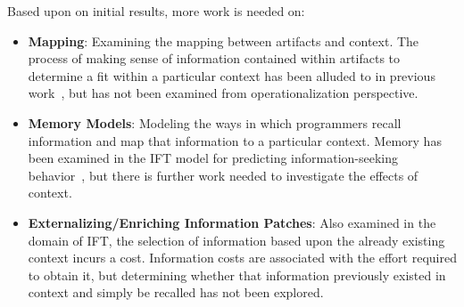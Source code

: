 Based upon on initial results, more work is needed on:
\begin{itemize}
\item \textbf{Mapping}: Examining the mapping between artifacts and context. The process of making sense of information contained within artifacts to determine a fit within a particular context has been alluded to in previous work~\cite{Pirolli:2005}, but has not been examined from operationalization perspective.
\item \textbf{Memory Models}: Modeling the ways in which programmers recall information and map that information to a particular context. Memory has been examined in the IFT model for predicting information-seeking behavior~\cite{Lawrance:2010,Lawrance:2013}, but there is further work needed to investigate the effects of context.
\item \textbf{Externalizing/Enriching Information Patches}: Also examined in the domain of IFT, the selection of information based upon the already existing context incurs a cost. Information costs are associated with the effort required to obtain it, but determining whether that information previously existed in context and simply be recalled has not been explored.
\end{itemize}